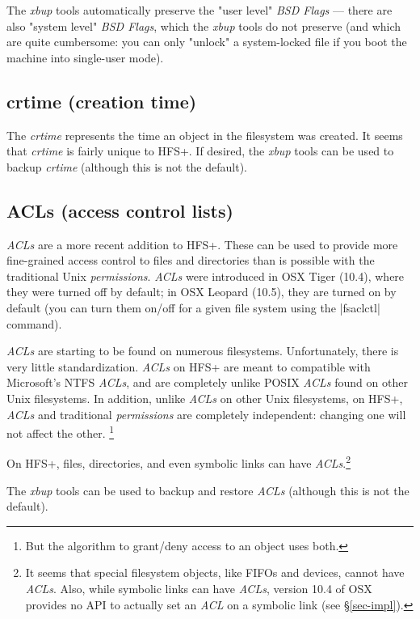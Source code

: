 \documentclass[11pt]{article}
\begin{document}
The \emph{xbup} tools automatically preserve the "user level"
\emph{BSD Flags} --- there are also "system level" \emph{BSD Flags},
which the \emph{xbup} tools do not preserve (and which are quite
cumbersome: you can only "unlock" a system-locked file if
you boot the machine into single-user mode).




\subsection{crtime (creation time)}

The \emph{crtime} represents the time an object in the filesystem
was created.
It seems that \emph{crtime} is fairly unique to HFS+.
If desired, the \emph{xbup} tools can be used to backup \emph{crtime}
(although this is not the default).

\subsection{ACLs (access control lists)}

\emph{ACLs} are a more recent addition to HFS+.
These can be used to provide more fine-grained access
control to files and directories than is possible with the traditional
Unix \emph{permissions}. 
\emph{ACLs} were introduced in OSX Tiger (10.4), where they
were turned off by default;
in OSX Leopard (10.5), they are turned on by default
(you can turn them on/off for a given file system
using the |fsaclctl| command).


\emph{ACLs} are starting to be found on numerous filesystems.
Unfortunately, there is very little standardization.
\emph{ACLs} on HFS+ are meant to compatible with Microsoft's NTFS
\emph{ACLs}, and are completely unlike POSIX \emph{ACLs} found
on other Unix filesystems.
In addition,
unlike \emph{ACLs} on other Unix filesystems, on HFS+,
\emph{ACLs} and traditional \emph{permissions} are completely
independent: changing one will not affect the other.%
\footnote{%
But the algorithm to grant/deny access to an object
uses both.}

On HFS+, files, directories, and even symbolic links
can have \emph{ACLs}.\footnote{%
It seems that special filesystem objects, like FIFOs and devices,
cannot have \emph{ACLs}.
Also, while symbolic links can have \emph{ACLs},
version 10.4 of OSX provides no API to actually set an \emph{ACL}
on a symbolic link (see \S\ref{sec-impl}).
}


The \emph{xbup} tools can be used to backup and restore
\emph{ACLs} (although this is not the default).
\end{document}
